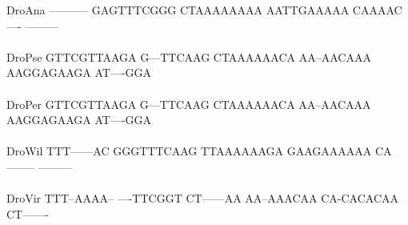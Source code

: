 \documentclass[11pt,twoside,reqno,a4paper]{article}
\begin{document}
{DroAna	-----------	GAGTTTCGGG	CTAAAAAAAA	AATTGAAAAA	CAAAAC----	---------\\
\hspace*{7\charwidth}\hspace*{1\charwidth}\hspace*{1\charwidth}\hspace*{1\charwidth}\hspace*{1\charwidth}\hspace*{1\charwidth}\\
DroPse	GTTCGTTAAGA	G---TTCAAG	CTAAAAAACA	AA--AACAAA	AAGGAGAAGA	AT----GGA\\
\hspace*{7\charwidth}\hspace*{1\charwidth}\hspace*{1\charwidth}\hspace*{1\charwidth}\hspace*{1\charwidth}\hspace*{1\charwidth}\\
DroPer	GTTCGTTAAGA	G---TTCAAG	CTAAAAAACA	AA--AACAAA	AAGGAGAAGA	AT----GGA\\
\hspace*{7\charwidth}\hspace*{1\charwidth}\hspace*{1\charwidth}\hspace*{1\charwidth}\hspace*{1\charwidth}\hspace*{1\charwidth}\\
DroWil	TTT------AC	GGGTTTCAAG	TTAAAAAAGA	GAAGAAAAAA	CA--------	---------\\
\hspace*{7\charwidth}\hspace*{1\charwidth}\hspace*{1\charwidth}\hspace*{1\charwidth}\hspace*{1\charwidth}\hspace*{1\charwidth}\\
DroVir	TTT--AAAA--	----TTCGGT	CT------AA	AA--AAACAA	CA-CACACAA	CT-------\\
\hspace*{7\charwidth}\hspace*{1\charwidth}\hspace*{1\charwidth}\hspace*{1\charwidth}\hspace*{1\charwidth}\hspace*{1\charwidth}\\
}
\end{document}
